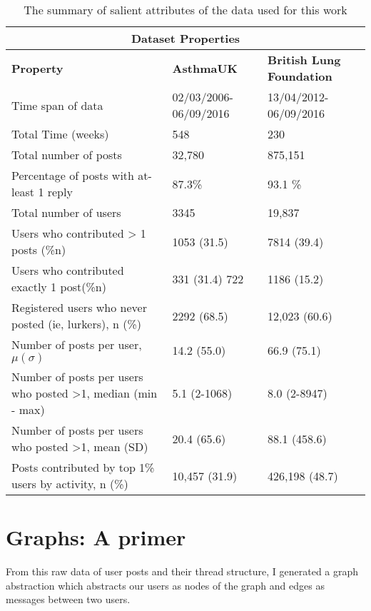 \begin{table}[htb!]
\centering
\begin{tabular}{ |p{5cm}|p{5cm}|p{5cm}| }
    \hline
    \multicolumn{3}{|c|}{Dataset Properties} \\
    \hline
    \hline
     \textbf{Property} & \textbf{AsthmaUK} & \textbf{British Lung Foundation} \\
    \hline
    \hline
     Time span of data   	& 02/03/2006-06/09/2016    	& 13/04/2012-06/09/2016 \\
    \hline
     Total Time (weeks)  	& 548						& 230 \\
    \hline
     Total number of posts	& 32,780					& 875,151 \\
    \hline
     Percentage of posts with at-least 1 reply & 87.3\%			& 93.1 \% \\
    \hline
     Total number of users &	3345					& 19,837 \\
    \hline
     Users who contributed > 1 posts (\%n) & 1053 (31.5)  & 7814 (39.4) \\
    \hline
     Users who contributed exactly 1 post(\%n) & 331 (31.4) 722 & 1186 (15.2) \\
    \hline
     Registered users who never posted (ie, lurkers), n (\%) & 2292 (68.5) & 12,023 (60.6) \\
    \hline
     Number of posts per user, $\mu(\sigma)$ & 14.2 (55.0) & 66.9 (75.1) \\
    \hline
    Number of posts per users who posted >1, median (min - max) & 5.1 (2-1068) & 8.0 (2-8947) \\
    \hline 
    Number of posts per users who posted >1, mean (SD) & 20.4 (65.6) & 88.1 (458.6) \\
    \hline
    Posts contributed by top 1\% users by activity, n (\%) & 10,457 (31.9) & 426,198 (48.7) \\
    \hline 
    
    \hline
\end{tabular}
\caption{The summary of salient attributes of the data used for this work}
\label{table:jmirData}
\end{table}



\section{Graphs: A primer}
From this raw data of user posts and their thread structure, I generated a graph abstraction which abstracts our users as nodes of the graph and edges as messages between two users. 


